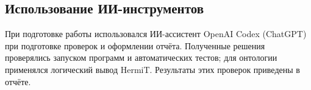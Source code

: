 \subsection*{Использование ИИ-инструментов}
При подготовке работы использовался ИИ-ассистент OpenAI Codex (ChatGPT)
при подготовке проверок и оформлении отчёта. Полученные решения проверялись
запуском программ и автоматических тестов; для онтологии применялся
логический вывод HermiT. Результаты этих проверок приведены в отчёте.
